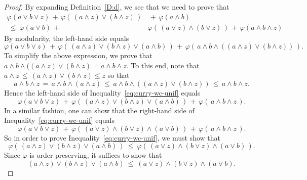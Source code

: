 \documentclass[main.tex]{subfiles}
\begin{document}
\begin{proof}
By expanding Definition~\ref{D:d},
we see that 
we need to prove that
\begin{equation}
\label{eq:curry-wc-unif}
\begin{split}
\varphi(a\vee b\vee z) \,+\,
\varphi(\,(a\wedge z)\vee(b\wedge z)\,) & \,+\,
\varphi(a\wedge b) \\
\ \leq\ 
\varphi(a \vee b)  \,+\, &
\varphi(\,(a\vee z)\wedge(b\vee z)\,) \,+\,
\varphi(a\wedge b \wedge z)
\end{split}
\end{equation}
By modularity,
the left-hand side equals
\begin{equation*}
\varphi(a\vee b \vee z) \,+\,
\varphi(\, (a\wedge z) \vee (b\wedge z) \vee (a\wedge b)\,) \,+\,
\varphi(\,a\wedge b\wedge ( (a \wedge z) \vee (b\wedge z) )\,).
\end{equation*}
To simplify the above expression,
we prove that
$a\wedge b\wedge ( (a \wedge z) \vee (b\wedge z)=a\wedge b\wedge z$.
To this end, note that
$a\wedge z \,\leq\, (a\wedge z)\vee (b\wedge z) \leq z$
so that 
\begin{equation*}
a\wedge b\wedge z
\, =\, a\wedge b \wedge (a\wedge z)
\,\leq\, a\wedge b \wedge ((a\wedge z)\vee (b\wedge z))
\,\leq\, a\wedge b \wedge z.
\end{equation*}
Hence the left-hand side of Inequality~\eqref{eq:curry-wc-unif}
equals
\begin{equation*}
\varphi(a\vee b \vee z) \,+\,
\varphi(\, (a\wedge z) \vee (b\wedge z) \vee (a\wedge b)\,) \,+\,
\varphi(\,a\wedge b\wedge z\,).
\end{equation*}
In a similar fashion,
one can show that the right-hand side of Inequality~\eqref{eq:curry-wc-unif}
equals
\begin{equation*}
\varphi(a\vee b \vee z) \,+\,
\varphi(\, (a\vee z) \wedge (b\vee z) \wedge (a\vee b)\,) \,+\,
\varphi(\,a\wedge b\wedge z\,).
\end{equation*}
So in order to prove Inequality~\eqref{eq:curry-wc-unif},
we must show that
\begin{equation*}
\varphi(\, (a\wedge z) \vee (b\wedge z) \vee (a\wedge b)\,) 
\ \leq\ 
\varphi(\, (a\vee z) \wedge (b\vee z) \wedge (a\vee b)\,).
\end{equation*}
Since $\varphi$ is order preserving,
it suffices to show that 
\begin{equation*}
 (a\wedge z) \vee (b\wedge z) \vee (a\wedge b)
\ \leq\ 
  (a\vee z) \wedge (b\vee z) \wedge (a\vee b).
\end{equation*}

\end{proof}
\end{document}
